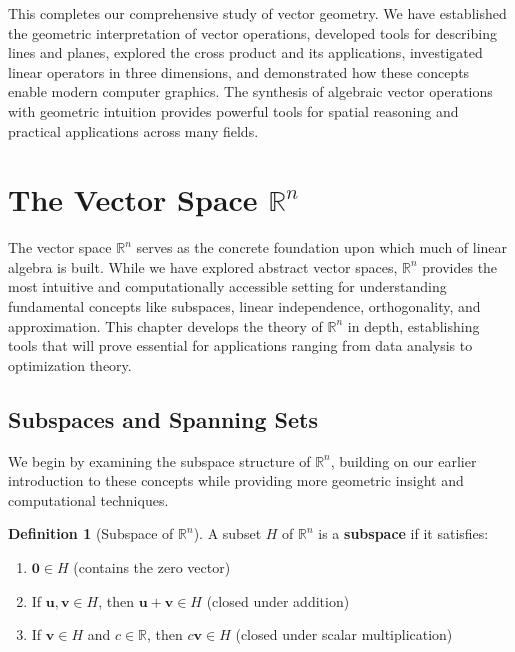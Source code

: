 \documentclass[12pt]{article}
\numberwithin{equation}{section}
\newcommand{\vect}[1]{\boldsymbol{#1}}   %
\theoremstyle{plain}
\theoremstyle{definition}
\newtheorem{definition}[theorem]{Definition}
\theoremstyle{remark}
\begin{document}
This completes our comprehensive study of vector geometry. We have established the geometric interpretation of vector operations, developed tools for describing lines and planes, explored the cross product and its applications, investigated linear operators in three dimensions, and demonstrated how these concepts enable modern computer graphics. The synthesis of algebraic vector operations with geometric intuition provides powerful tools for spatial reasoning and practical applications across many fields.

\newpage
\section{The Vector Space $\mathbb{R}^n$}

The vector space $\mathbb{R}^n$ serves as the concrete foundation upon which much of linear algebra is built. While we have explored abstract vector spaces, $\mathbb{R}^n$ provides the most intuitive and computationally accessible setting for understanding fundamental concepts like subspaces, linear independence, orthogonality, and approximation. This chapter develops the theory of $\mathbb{R}^n$ in depth, establishing tools that will prove essential for applications ranging from data analysis to optimization theory.

\subsection{Subspaces and Spanning Sets}

We begin by examining the subspace structure of $\mathbb{R}^n$, building on our earlier introduction to these concepts while providing more geometric insight and computational techniques.

\begin{definition}[Subspace of $\mathbb{R}^n$]
A subset $H$ of $\mathbb{R}^n$ is a \textbf{subspace} if it satisfies:
\begin{enumerate}
\item $\vect{0} \in H$ (contains the zero vector)
\item If $\vect{u}, \vect{v} \in H$, then $\vect{u} + \vect{v} \in H$ (closed under addition)
\item If $\vect{v} \in H$ and $c \in \mathbb{R}$, then $c\vect{v} \in H$ (closed under scalar multiplication)
\end{enumerate}
\end{definition}
\end{document}
